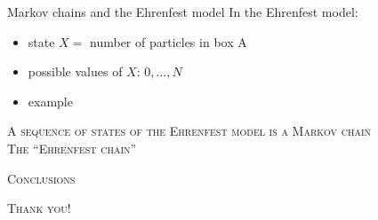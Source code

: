 \documentclass[usenames,dvipsnames]{beamer}
\begin{document}
  \begin{frame}{Markov chains and the Ehrenfest model}
    \Large In the Ehrenfest model:
    \normalsize
    \begin{itemize}
      \item<1-> state $X = $ number of particles in box A
      \item<2-> possible values of $X$: $0, \dots, N$
      \item<3-> example
    \end{itemize}
    
    \begin{figure}[r]
    \end{figure}
  \end{frame}

  \begin{frame}[standout]
    \textsc{A sequence of states of the Ehrenfest model is a Markov chain}\\
    \vspace{30pt}
    \textsc{The \enquote{Ehrenfest chain}}
  \end{frame}


  

  


\begin{frame}
  \Large 
  \centering
  \textsc{Conclusions}
\end{frame}

\begin{frame}[standout]
  \LARGE
  \textsc{Thank you!}
\end{frame}
\end{document}
